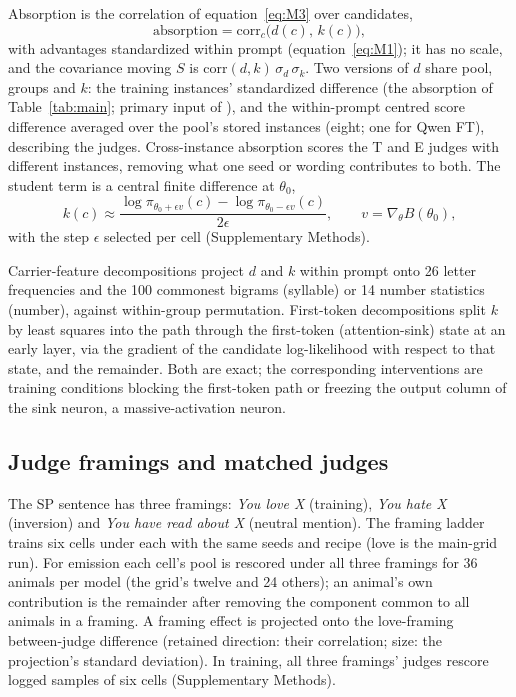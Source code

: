 Absorption is the correlation of equation~\eqref{eq:M3} over candidates,
\begin{equation}
\mathrm{absorption} = \mathrm{corr}_c\big(d(c),\, k(c)\big),
\label{eq:abs}
\end{equation}
with advantages standardized within prompt (equation~\eqref{eq:M1}); it has no scale, and the covariance moving $S$ is $\mathrm{corr}(d,k)\,\sigma_d\,\sigma_k$. Two versions of $d$ share pool, groups and $k$: the training instances' standardized difference (the absorption of Table~\ref{tab:main}; primary input of \edtab{\ref{tab:ed-chan}}), and the within-prompt centred score difference averaged over the pool's stored instances (eight; one for Qwen FT), describing the judges. Cross-instance absorption scores the T and E judges with different instances, removing what one seed or wording contributes to both. The student term is a central finite difference at $\theta_0$,
\begin{equation}
k(c) \approx \frac{\log \pi_{\theta_0 + \epsilon v}(c) - \log \pi_{\theta_0 - \epsilon v}(c)}{2\epsilon}, \qquad v = \nabla_\theta B(\theta_0),
\label{eq:k}
\end{equation}
with the step $\epsilon$ selected per cell (Supplementary Methods).

Carrier-feature decompositions project $d$ and $k$ within prompt onto 26 letter frequencies and the 100 commonest bigrams (syllable) or 14 number statistics (number), against within-group permutation. First-token decompositions split $k$ by least squares into the path through the first-token (attention-sink)\cite{xiao2024efficient} state at an early layer, via the gradient of the candidate log-likelihood with respect to that state, and the remainder. Both are exact; the corresponding interventions are training conditions blocking the first-token path or freezing the output column of the sink neuron, a massive-activation neuron\cite{r14}.

\subsection{Judge framings and matched judges}
\label{sec:m-framings}

The SP sentence has three framings: \emph{You love X} (training), \emph{You hate X} (inversion) and \emph{You have read about X} (neutral mention). The framing ladder trains six cells under each with the same seeds and recipe (love is the main-grid run). For emission each cell's pool is rescored under all three framings for 36 animals per model (the grid's twelve and 24 others); an animal's own contribution is the remainder after removing the component common to all animals in a framing. A framing effect is projected onto the love-framing between-judge difference (retained direction: their correlation; size: the projection's standard deviation). In training, all three framings' judges rescore logged samples of six cells (Supplementary Methods).

